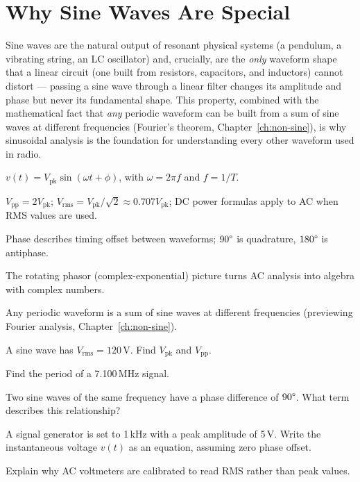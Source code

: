 \section{Why Sine Waves Are Special}

Sine waves are the natural output of resonant physical systems (a
pendulum, a vibrating string, an LC oscillator) and, crucially, are the
\emph{only} waveform shape that a linear circuit (one built from
resistors, capacitors, and inductors) cannot distort --- passing a sine
wave through a linear filter changes its amplitude and phase but never
its fundamental shape. This property, combined with the mathematical fact
that \emph{any} periodic waveform can be built from a sum of sine waves
at different frequencies (Fourier's theorem, Chapter~\ref{ch:non-sine}),
is why sinusoidal analysis is the foundation for understanding every
other waveform used in radio.

\begin{quickreview}
\item $v(t) = V_{\text{pk}}\sin(\omega t + \phi)$, with $\omega = 2\pi f$
and $f = 1/T$.
\item $V_{\text{pp}} = 2V_{\text{pk}}$; $V_{\text{rms}} =
V_{\text{pk}}/\sqrt2 \approx 0.707 V_{\text{pk}}$; DC power formulas apply
to AC when RMS values are used.
\item Phase describes timing offset between waveforms; $90\degree$ is
quadrature, $180\degree$ is antiphase.
\item The rotating phasor (complex-exponential) picture turns AC analysis
into algebra with complex numbers.
\item Any periodic waveform is a sum of sine waves at different
frequencies (previewing Fourier analysis, Chapter~\ref{ch:non-sine}).
\end{quickreview}

\begin{practiceproblems}
\item A sine wave has $V_{\text{rms}} = 120\,\text{V}$. Find
$V_{\text{pk}}$ and $V_{\text{pp}}$.
\item Find the period of a 7.100\,MHz signal.
\item Two sine waves of the same frequency have a phase difference of
$90\degree$. What term describes this relationship?
\item A signal generator is set to 1\,kHz with a peak amplitude of 5\,V.
Write the instantaneous voltage $v(t)$ as an equation, assuming zero
phase offset.
\item Explain why AC voltmeters are calibrated to read RMS rather than
peak values.
\end{practiceproblems}
